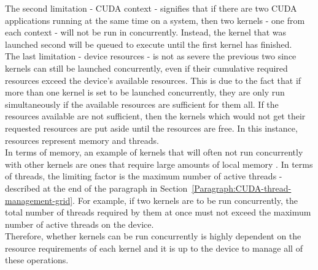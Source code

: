 The second limitation - CUDA context - signifies that if there are two CUDA applications running at the same time on a system, then two kernels - one from each context - will not be run in concurrently. Instead, the kernel that was launched second will be queued to execute until the first kernel has finished. \\
The last limitation - device resources - is not as severe the previous two since kernels can still be launched concurrently, even if their cumulative required resources exceed the device's available resources. This is due to the fact that if more than one kernel is set to be launched concurrently, they are only run simultaneously if the available resources are sufficient for them all. If the resources available are not sufficient, then the kernels which would not get their requested resources are put aside until the resources are free. In this instance, resources represent memory and threads. \\
In terms of memory, an example of kernels that will often not run concurrently with other kernels are ones that require large amounts of local memory \cite{NVIDIAMay2022}. In terms of threads, the limiting factor is the maximum number of active threads - described at the end of the \textit{} paragraph in Section~\ref{Paragraph:CUDA-thread-management-grid}. For example, if two kernels are to be run concurrently, the total number of threads required by them at once must not exceed the maximum number of active threads on the device. \\
Therefore, whether kernels can be run concurrently is highly dependent on the resource requirements of each kernel and it is up to the device to manage all of these operations.


